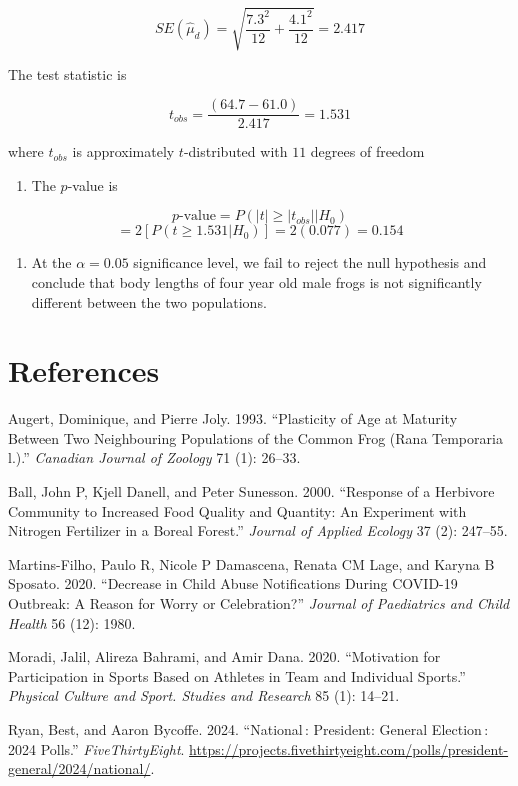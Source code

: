 \documentclass[
]{article}
\providecommand{\tightlist}{%
  \setlength{\itemsep}{0pt}\setlength{\parskip}{0pt}}
\newlength{\cslhangindent}
\newenvironment{CSLReferences}[2] %
 {\begin{list}{}{%
  \setlength{\itemindent}{0pt}
  \setlength{\leftmargin}{0pt}
  \setlength{\parsep}{0pt}
  \ifodd #1
   \setlength{\leftmargin}{\cslhangindent}
   \setlength{\itemindent}{-1\cslhangindent}
  \fi
  \setlength{\itemsep}{#2\baselineskip}}}
 {\end{list}}
\begin{document}
\[ SE(\hat{\mu}_d) = \sqrt{\frac{7.3^2}{12}+\frac{4.1^2}{12}} = 2.417\]

The test statistic is

\[ t_{obs} = \frac{(64.7 - 61.0)}{2.417} = 1.531\]

where \(t_{obs}\) is approximately \(t\)-distributed with \(11\) degrees
of freedom

\begin{enumerate}
\def\labelenumi{\arabic{enumi}.}
\setcounter{enumi}{2}
\tightlist
\item
  The \(p\)-value is
\end{enumerate}

\[ p\text{-value} = P(|t|\geq |t_{obs}||H_0) \]
\[= 2\left[P(t \geq 1.531 | H_0)\right] = 2(0.077) = 0.154\]

\begin{enumerate}
\def\labelenumi{\arabic{enumi}.}
\setcounter{enumi}{3}
\tightlist
\item
  {At the \(\alpha = 0.05\) significance level, we fail to reject the
  null hypothesis and conclude that body lengths of four year old male
  frogs is not significantly different between the two populations.}
\end{enumerate}

\newpage

\section*{References}\label{references}

\label{refs}
\begin{CSLReferences}{1}{0}
Augert, Dominique, and Pierre Joly. 1993. {``Plasticity of Age at
Maturity Between Two Neighbouring Populations of the Common Frog (Rana
Temporaria l.).''} \emph{Canadian Journal of Zoology} 71 (1): 26--33.

Ball, John P, Kjell Danell, and Peter Sunesson. 2000. {``Response of a
Herbivore Community to Increased Food Quality and Quantity: An
Experiment with Nitrogen Fertilizer in a Boreal Forest.''} \emph{Journal
of Applied Ecology} 37 (2): 247--55.

Martins-Filho, Paulo R, Nicole P Damascena, Renata CM Lage, and Karyna B
Sposato. 2020. {``Decrease in Child Abuse Notifications During COVID-19
Outbreak: A Reason for Worry or Celebration?''} \emph{Journal of
Paediatrics and Child Health} 56 (12): 1980.

Moradi, Jalil, Alireza Bahrami, and Amir Dana. 2020. {``Motivation for
Participation in Sports Based on Athletes in Team and Individual
Sports.''} \emph{Physical Culture and Sport. Studies and Research} 85
(1): 14--21.

Ryan, Best, and Aaron Bycoffe. 2024. {``National\,: President: General
Election\,: 2024 Polls.''} \emph{FiveThirtyEight}.
\url{https://projects.fivethirtyeight.com/polls/president-general/2024/national/}.

\end{CSLReferences}
\end{document}
